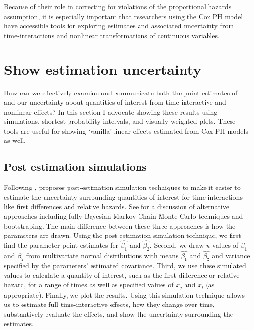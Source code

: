 \documentclass[nojss]{jss}\usepackage[]{graphicx}\usepackage[]{color}
\begin{document}
Because of their role in correcting for violations of the proportional hazards assumption, it is especially important that researchers using the Cox PH model have accessible tools for exploring estimates and associated uncertainty from time-interactions and nonlinear transformations of continuous variables.

\section[Show estimates]{Show estimation uncertainty}

How can we effectively examine and communicate both the point estimates of and our uncertainty about quantities of interest from time-interactive and nonlinear effects? In this section I advocate showing these results using simulations, shortest probability intervals, and visually-weighted plots. These tools are useful for showing `vanilla' linear effects estimated from Cox PH models as well.

\subsection{Post estimation simulations}

Following \cite{King2000}, \cite{Licht2011} proposes post-estimation simulation techniques to make it easier to estimate the uncertainty surrounding quantities of interest for time interactions like first differences and relative hazards. See \citet[352-353]{King2000} for a discussion of alternative approaches including fully Bayesian Markov-Chain Monte Carlo techniques and bootstraping. The main difference between these three approaches is how the parameters are drawn. Using the post-estimation simulation technique, we first find the parameter point estimates for $\hat{\beta_{1}}$ and $\hat{\beta_{2}}$. Second, we draw $n$ values of $\beta_{1}$ and $\beta_{2}$ from multivariate normal distributions with means $\hat{\beta_{1}}$ and $\hat{\beta_{2}}$ and variance specified by the parameters' estimated covariance. Third, we use these simulated values to calculate a quantity of interest, such as the first difference or relative hazard, for a range of times as well as specified values of $x_{j}$ and $x_{l}$ (as appropriate). Finally, we plot the results. Using this simulation technique allows us to estimate full time-interactive effects, how they change over time, substantively evaluate the effects, and show the uncertainty surrounding the estimates.
\end{document}
